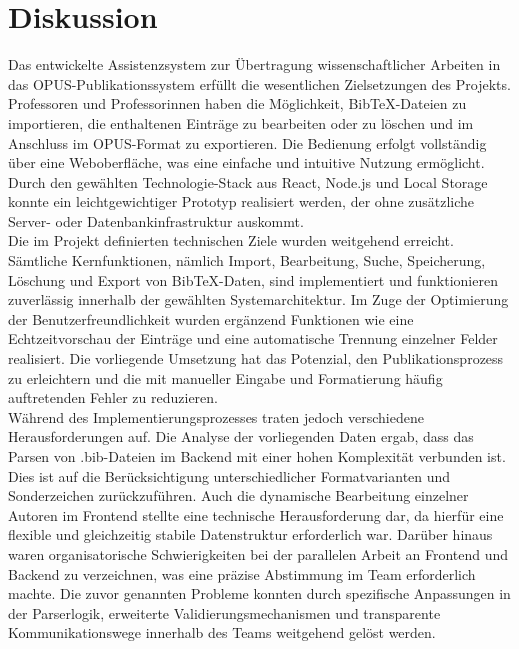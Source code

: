 \chapter{Diskussion}
Das entwickelte Assistenzsystem zur Übertragung wissenschaftlicher Arbeiten in das OPUS-Publikationssystem erfüllt die wesentlichen 
Zielsetzungen des Projekts. Professoren und Professorinnen haben die Möglichkeit, BibTeX-Dateien zu importieren, die enthaltenen 
Einträge zu bearbeiten oder zu löschen und im Anschluss im OPUS-Format zu exportieren. Die Bedienung erfolgt vollständig über 
eine Weboberfläche, was eine einfache und intuitive Nutzung ermöglicht. Durch den gewählten Technologie-Stack aus React, Node.js 
und Local Storage konnte ein leichtgewichtiger Prototyp realisiert werden, der ohne zusätzliche Server- oder Datenbankinfrastruktur 
auskommt.\\

\noindent Die im Projekt definierten technischen Ziele wurden weitgehend erreicht. Sämtliche Kernfunktionen, nämlich Import, Bearbeitung, 
Suche, Speicherung, Löschung und Export von BibTeX-Daten, sind implementiert und funktionieren zuverlässig innerhalb der gewählten 
Systemarchitektur. Im Zuge der Optimierung der Benutzerfreundlichkeit wurden ergänzend Funktionen wie eine Echtzeitvorschau der 
Einträge und eine automatische Trennung einzelner Felder realisiert. Die vorliegende Umsetzung hat das Potenzial, den 
Publikationsprozess zu erleichtern und die mit manueller Eingabe und Formatierung häufig auftretenden Fehler zu reduzieren.\\

\noindent Während des Implementierungsprozesses traten jedoch verschiedene Herausforderungen auf. Die Analyse der vorliegenden Daten ergab, 
dass das Parsen von .bib-Dateien im Backend mit einer hohen Komplexität verbunden ist. Dies ist auf die Berücksichtigung 
unterschiedlicher Formatvarianten und Sonderzeichen zurückzuführen. Auch die dynamische Bearbeitung einzelner Autoren im 
Frontend stellte eine technische Herausforderung dar, da hierfür eine flexible und gleichzeitig stabile Datenstruktur 
erforderlich war. Darüber hinaus waren organisatorische Schwierigkeiten bei der parallelen Arbeit an Frontend und 
Backend zu verzeichnen, was eine präzise Abstimmung im Team erforderlich machte. Die zuvor genannten Probleme konnten 
durch spezifische Anpassungen in der Parserlogik, erweiterte Validierungsmechanismen und transparente Kommunikationswege 
innerhalb des Teams weitgehend gelöst werden.\\

